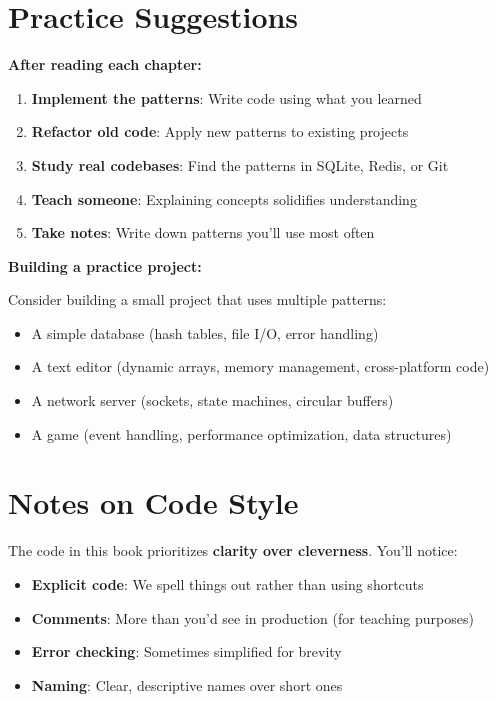\documentclass[10pt,openany]{book}
\begin{document}
\section*{Practice Suggestions}

\textbf{After reading each chapter:}

\begin{enumerate}
    \item \textbf{Implement the patterns}: Write code using what you learned
    \item \textbf{Refactor old code}: Apply new patterns to existing projects
    \item \textbf{Study real codebases}: Find the patterns in SQLite, Redis, or Git
    \item \textbf{Teach someone}: Explaining concepts solidifies understanding
    \item \textbf{Take notes}: Write down patterns you'll use most often
\end{enumerate}

\textbf{Building a practice project:}

Consider building a small project that uses multiple patterns:
\begin{itemize}
    \item A simple database (hash tables, file I/O, error handling)
    \item A text editor (dynamic arrays, memory management, cross-platform code)
    \item A network server (sockets, state machines, circular buffers)
    \item A game (event handling, performance optimization, data structures)
\end{itemize}

\section*{Notes on Code Style}

The code in this book prioritizes \textbf{clarity over cleverness}. You'll notice:

\begin{itemize}
    \item \textbf{Explicit code}: We spell things out rather than using shortcuts
    \item \textbf{Comments}: More than you'd see in production (for teaching purposes)
    \item \textbf{Error checking}: Sometimes simplified for brevity
    \item \textbf{Naming}: Clear, descriptive names over short ones
\end{itemize}
\end{document}
